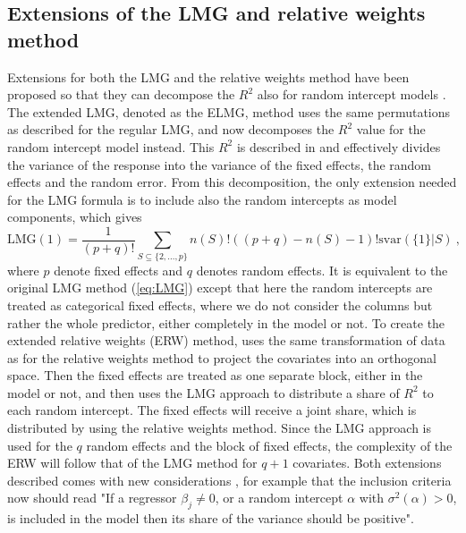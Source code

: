 \subsection{Extensions of the LMG and relative weights method}
Extensions for both the LMG and the relative weights method have been proposed so that they can decompose the $R^2$ also for random intercept models \citep{matre}. 
The extended LMG, denoted as the ELMG, method uses the same permutations as described for the regular LMG, and now decomposes the $R^2$ value for the random intercept model instead.
This $R^2$ is described in  and effectively divides the variance of the response into the variance of the fixed effects, the random effects and the random error.
From this decomposition, the only extension needed for the LMG formula is to include also the random intercepts as model components, which gives \citep{matre}
\begin{equation}
    \text{LMG}(1) = \frac{1}{(p+q)!} \sum_{S \subseteq \{2, ..., p\}} n(S)! ((p+q) - n(S)-1)! \text{svar}(\{1\} \lvert S) \ ,
\end{equation}
where $p$ denote fixed effects and $q$ denotes random effects. It is equivalent to the original LMG method (\eqref{eq:LMG}) except that here the random intercepts are treated as categorical fixed effects, where we do not consider the columns but rather the whole predictor, either completely in the model or not.
\newline
\newline
To create the extended relative weights (ERW) method, \citet{matre} uses the same transformation of data as for the relative weights method to project the covariates into an orthogonal space. 
Then the fixed effects are treated as one separate block, either in the model or not, and then uses the LMG approach to distribute a share of $R^2$ to each random intercept.
The fixed effects will receive a joint share, which is distributed by using the relative weights method.
Since the LMG approach is used for the $q$ random effects and the block of fixed effects, the complexity of the ERW will follow that of the LMG method for $q+1$ covariates.
\newline 
\newline
Both extensions described comes with new considerations \citep[for full details]{matre}, for example that the inclusion criteria now should read "If a regressor $\beta_j \neq 0$, or a random intercept $\alpha$ with $\sigma^2(\alpha) > 0$, is included in the model then its share of the variance should be positive".
